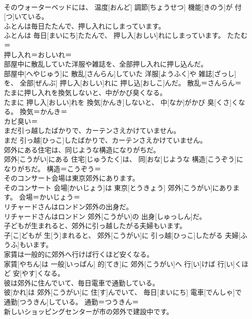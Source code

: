\documentclass[8pt]{extreport}
\begin{document}
\begin{CJK}{UTF8}{min}
\\	そのウォーターベッドには、 温度[おんど] 調節[ちょうせつ] 機能[きのう]が 付[つ]いている。	
\\	ふとんは毎日たたんで、押し入れにしまっています。	
\\	ふとんは 毎日[まいにち]たたんで、 押し入[おしい]れにしまっています。	たたむ＝ 
\\	押し入れ＝おしいれ＝ 
\\	部屋中に散乱していた洋服や雑誌を、全部押し入れに押し込んだ。	
\\	部屋中[へやじゅう]に 散乱[さんらん]していた 洋服[ようふく]や 雑誌[ざっし]を、 全部[ぜんぶ] 押し入[おしい]れに 押し込[おしこ]んだ。	散乱＝さんらん＝ 
\\	たまに押し入れを換気しないと、中がかび臭くなる。	
\\	たまに 押し入[おしい]れを 換気[かんき]しないと、 中[なか]がかび 臭[くさ]くなる。	換気＝かんき＝ 
\\	カビ臭い＝ 
\\	まだ引っ越したばかりで、カーテンさえかけていません。	
\\	まだ 引っ越[ひっこ]したばかりで、カーテンさえかけていません。	
\\	郊外にある住宅は、同じような構造になりがちだ。	
\\	郊外[こうがい]にある 住宅[じゅうたく]は、 同[おな]じような 構造[こうぞう]になりがちだ。	構造＝こうぞう＝ 
\\	そのコンサート会場は東京郊外にあります。	
\\	そのコンサート 会場[かいじょう]は 東京[とうきょう] 郊外[こうがい]にあります。	会場＝かいじょう＝ 
\\	リチャードさんはロンドン郊外の出身だ。	
\\	リチャードさんはロンドン 郊外[こうがい]の 出身[しゅっしん]だ。	
\\	子どもが生まれると、郊外に引っ越したがる夫婦もいます。	
\\	子[こ]どもが 生[う]まれると、 郊外[こうがい]に 引っ越[ひっこ]したがる 夫婦[ふうふ]もいます。	
\\	家賃は一般的に郊外へ行けば行くほど安くなる。	
\\	家賃[やちん]は 一般[いっぱん] 的[てき]に 郊外[こうがい]へ 行[い]けば 行[い]くほど 安[やす]くなる。	
\\	彼は郊外に住んでいて、毎日電車で通勤している。	
\\	彼[かれ]は 郊外[こうがい]に 住[す]んでいて、 毎日[まいにち] 電車[でんしゃ]で 通勤[つうきん]している。	通勤＝つうきん＝ 
\\	新しいショッピングセンターが市の郊外で建設中です。	

\end{CJK}
\end{document}
